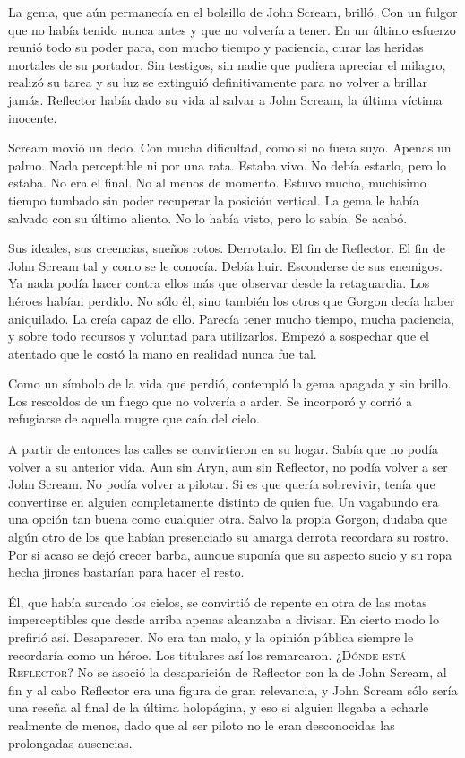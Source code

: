 La gema, que aún permanecía en el bolsillo de John Scream, brilló. Con un fulgor que no había tenido nunca antes y que no volvería a tener. En un último esfuerzo reunió todo su poder para, con mucho tiempo y paciencia, curar las heridas mortales de su portador. Sin testigos, sin nadie que pudiera apreciar el milagro, realizó su tarea y su luz se extinguió definitivamente para no volver a brillar jamás. Reflector había dado su vida al salvar a John Scream, la última víctima inocente.

Scream movió un dedo. Con mucha dificultad, como si no fuera suyo. Apenas un palmo. Nada perceptible ni por una rata. Estaba vivo. No debía estarlo, pero lo estaba. No era el final. No al menos de momento. Estuvo mucho, muchísimo tiempo tumbado sin poder recuperar la posición vertical. La gema le había salvado con su último aliento. No lo había visto, pero lo sabía. Se acabó.

Sus ideales, sus creencias, sueños rotos. Derrotado. El fin de Reflector. El fin de John Scream tal y como se le conocía. Debía huir. Esconderse de sus enemigos. Ya nada podía hacer contra ellos más que observar desde la retaguardia. Los héroes habían perdido. No sólo él, sino también los otros que Gorgon decía haber aniquilado. La creía capaz de ello. Parecía tener mucho tiempo, mucha paciencia, y sobre todo recursos y voluntad para utilizarlos. Empezó a sospechar que el atentado que le costó la mano en realidad nunca fue tal.

Como un símbolo de la vida que perdió, contempló la gema apagada y sin brillo. Los rescoldos de un fuego que no volvería a arder. Se incorporó y corrió a refugiarse de aquella mugre que caía del cielo.

A partir de entonces las calles se convirtieron en su hogar. Sabía que no podía volver a su anterior vida. Aun sin Aryn, aun sin Reflector, no podía volver a ser John Scream. No podía volver a pilotar. Si es que quería sobrevivir, tenía que convertirse en alguien completamente distinto de quien fue. Un vagabundo era una opción tan buena como cualquier otra. Salvo la propia Gorgon, dudaba que algún otro de los que habían presenciado su amarga derrota recordara su rostro. Por si acaso se dejó crecer barba, aunque suponía que su aspecto sucio y su ropa hecha jirones bastarían para hacer el resto.

Él, que había surcado los cielos, se convirtió de repente en otra de las motas imperceptibles que desde arriba apenas alcanzaba a divisar. En cierto modo lo prefirió así. Desaparecer. No era tan malo, y la opinión pública siempre le recordaría como un héroe. Los titulares así los remarcaron. \textsc{¿Dónde está Reflector?} No se asoció la desaparición de Reflector con la de John Scream, al fin y al cabo Reflector era una figura de gran relevancia, y John Scream sólo sería una reseña al final de la última holopágina, y eso si alguien llegaba a echarle realmente de menos, dado que al ser piloto no le eran desconocidas las prolongadas ausencias.

